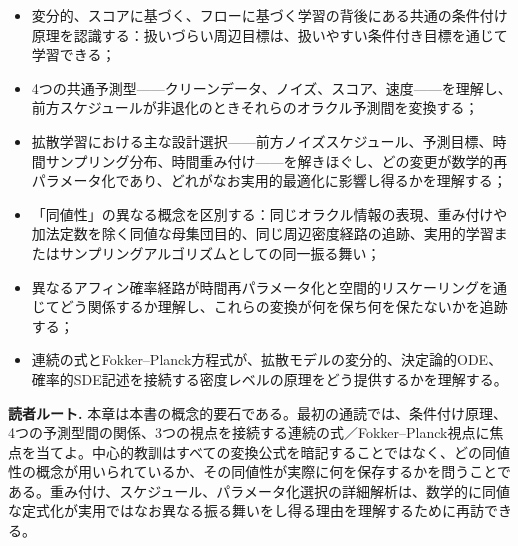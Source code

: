 \begin{itemize}
\item 変分的、スコアに基づく、フローに基づく学習の背後にある共通の条件付け原理を認識する：扱いづらい周辺目標は、扱いやすい条件付き目標を通じて学習できる；
\item 4つの共通予測型——クリーンデータ、ノイズ、スコア、速度——を理解し、前方スケジュールが非退化のときそれらのオラクル予測間を変換する；
\item 拡散学習における主な設計選択——前方ノイズスケジュール、予測目標、時間サンプリング分布、時間重み付け——を解きほぐし、どの変更が数学的再パラメータ化であり、どれがなお実用的最適化に影響し得るかを理解する；
\item 「同値性」の異なる概念を区別する：同じオラクル情報の表現、重み付けや加法定数を除く同値な母集団目的、同じ周辺密度経路の追跡、実用的学習またはサンプリングアルゴリズムとしての同一振る舞い；
\item 異なるアフィン確率経路が時間再パラメータ化と空間的リスケーリングを通じてどう関係するか理解し、これらの変換が何を保ち何を保たないかを追跡する；
\item 連続の式とFokker–Planck方程式が、拡散モデルの変分的、決定論的ODE、確率的SDE記述を接続する密度レベルの原理をどう提供するかを理解する。
\end{itemize}


\textbf{読者ルート.} 本章は本書の概念的要石である。最初の通読では、条件付け原理、4つの予測型間の関係、3つの視点を接続する連続の式／Fokker–Planck視点に焦点を当てよ。中心的教訓はすべての変換公式を暗記することではなく、どの同値性の概念が用いられているか、その同値性が実際に何を保存するかを問うことである。重み付け、スケジュール、パラメータ化選択の詳細解析は、数学的に同値な定式化が実用ではなお異なる振る舞いをし得る理由を理解するために再訪できる。

